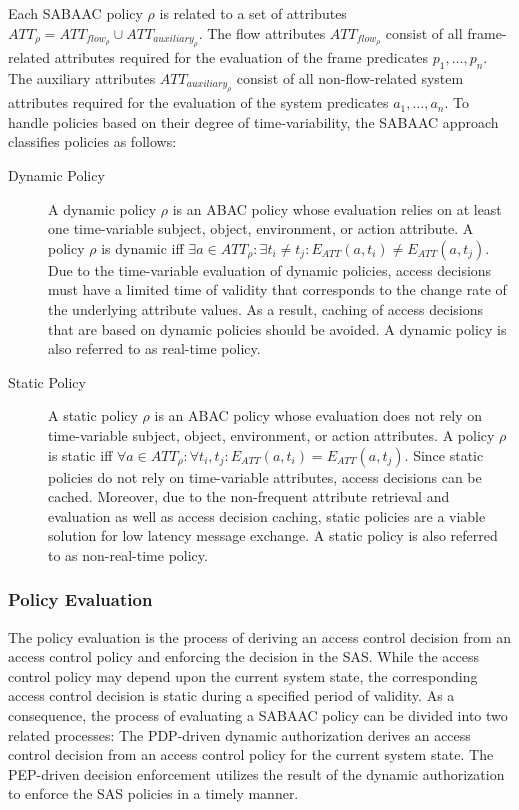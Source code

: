 Each SABAAC policy $\rho$ is related to a set of attributes $ATT_{\rho} = ATT_{flow_{\rho}} \cup ATT_{auxiliary_{\rho}}$.
The flow attributes $ATT_{flow_{\rho}}$ consist of all frame-related attributes required for the evaluation of the frame predicates $p_1, \dots, p_n$.
The auxiliary attributes $ATT_{auxiliary_{\rho}}$ consist of all non-flow-related system attributes required for the evaluation of the system predicates $a_1, \dots, a_n$.
To handle policies based on their degree of time-variability, the SABAAC approach classifies policies as follows:
\begin{description}
    \item[Dynamic Policy] A dynamic policy $\rho$ is an ABAC policy whose evaluation relies on at least one time-variable subject, object, environment, or action attribute.
    A policy $\rho$ is dynamic iff $\exists a \in ATT_{\rho}: \exists t_i \neq t_j: E_{ATT}(a,t_i) \neq E_{ATT}(a,t_j)$.
    Due to the time-variable evaluation of dynamic policies, access decisions must have a limited time of validity that corresponds to the change rate of the underlying attribute values.
    As a result, caching of access decisions that are based on dynamic policies should be avoided.
    A dynamic policy is also referred to as real-time policy.
    \item[Static Policy] A static policy $\rho$ is an ABAC policy whose evaluation does not rely on time-variable subject, object, environment, or action attributes.
    A policy $\rho$ is static iff $\forall a \in ATT_{\rho}: \forall t_i,t_j: E_{ATT}(a,t_i) = E_{ATT}(a,t_j)$.
    Since static policies do not rely on time-variable attributes, access decisions can be cached.
    Moreover, due to the non-frequent attribute retrieval and evaluation as well as access decision caching, static policies are a viable solution for low latency message exchange.
    A static policy is also referred to as non-real-time policy.
\end{description}

\subsubsection{Policy Evaluation}
The policy evaluation is the process of deriving an access control decision from an access control policy and enforcing the decision in the SAS.
While the access control policy may depend upon the current system state, the corresponding access control decision is static during a specified period of validity.
As a consequence, the process of evaluating a SABAAC policy can be divided into two related processes:
The PDP-driven dynamic authorization derives an access control decision from an access control policy for the current system state.
The PEP-driven decision enforcement utilizes the result of the dynamic authorization to enforce the SAS policies in a timely manner.

